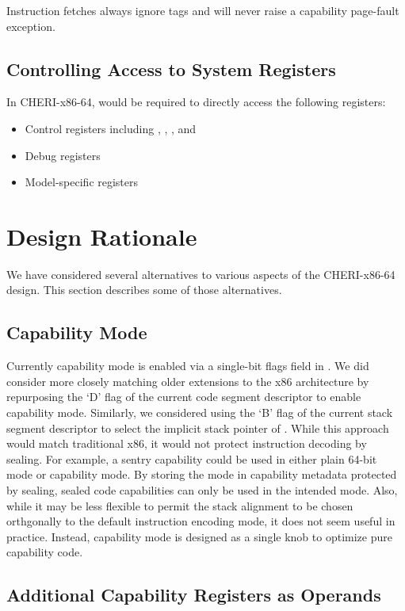 Instruction fetches always ignore tags and will never raise a
capability page-fault exception.

\subsection{Controlling Access to System Registers}

In CHERI-x86-64, \cappermASR{} would be required to directly access the
following registers:

\begin{itemize}
  \item Control registers including \KCC{}, \KSC{}, \CSTAR{}, and \KGS{}
  \item Debug registers
  \item Model-specific registers
\end{itemize}

\section{Design Rationale}

We have considered several alternatives to various aspects of the
CHERI-x86-64 design.  This section describes some of those
alternatives.

\subsection{Capability Mode}

Currently capability mode is enabled via a single-bit flags field in
\CIP{}.  We did consider more closely matching older extensions to the
x86 architecture by repurposing the `D' flag of the current code
segment descriptor to enable capability mode.  Similarly, we
considered using the `B' flag of the current stack segment descriptor
to select the implicit stack pointer of \CSP{}.  While this approach
would match traditional x86, it would not protect instruction decoding
by sealing.  For example, a sentry capability could be used in either
plain 64-bit mode or capability mode.  By storing the mode in
capability metadata protected by sealing, sealed code capabilities can
only be used in the intended mode.  Also, while it may be less
flexible to permit the stack alignment to be chosen orthgonally to the
default instruction encoding mode, it does not seem useful in
practice.  Instead, capability mode is designed as a single knob to
optimize pure capability code.

\subsection{Additional Capability Registers as Operands}

